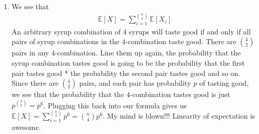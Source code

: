 \documentclass[12pt]{article}
\theoremstyle{definition}
\theoremstyle{remark}
\newcommand{\E}{\mathbb{E}}
\begin{document}
\begin{enumerate}[leftmargin=\labelsep]
\begin{enumerate}
			\item
			We see that
			\begin{align*}
				\E[X] = \sum_{i=1}^{n \choose 4} \E[X_i]
			\end{align*}
			An arbitrary syrup combination of 4 syrups will taste good if and only if all pairs of syrup combinations in the 4-combination taste good. There are ${4 \choose 2}$ pairs in any 4-combination. Line them up again, the probability that the syrup combination tastes good is going to be the probability that the first pair tastes good * the probability the second pair tastes good and so on. Since there are ${4 \choose 2}$ pairs, and each pair has probability $p$ of tasting good, we see that the probability that the 4-combination tastes good is just $p^{4 \choose 2} = p^6$. Plugging this back into our formula gives us $\E[X] = \sum_{i=1}^{n \choose 4} p^6 = {n \choose 4}p^6$. My mind is blown!!! Linearity of expectation is awesome.
		\end{enumerate}
		

\end{enumerate}
\end{document}
